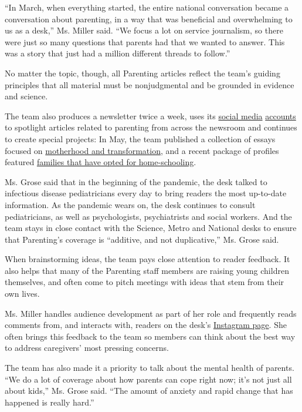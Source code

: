 ``In March, when everything started, the entire national conversation
became a conversation about parenting, in a way that was beneficial and
overwhelming to us as a desk,'' Ms. Miller said. ``We focus a lot on
service journalism, so there were just so many questions that parents
had that we wanted to answer. This was a story that just had a million
different threads to follow.''

No matter the topic, though, all Parenting articles reflect the team's
guiding principles that all material must be nonjudgmental and be
grounded in evidence and science.

The team also produces a newsletter twice a week, uses its
\href{https://www.instagram.com/nytparenting/?hl=en}{social media}
\href{https://twitter.com/NYTParenting?ref_src=twsrc\%5Egoogle\%7Ctwcamp\%5Eserp\%7Ctwgr\%5Eauthor}{accounts}
to spotlight articles related to parenting from across the newsroom and
continues to create special projects: In May, the team published a
collection of essays focused on
\href{https://www.nytimes3xbfgragh.onion/2020/05/07/parenting/motherhood-changes-us-all.html}{motherhood
and transformation}, and a recent package of profiles featured
\href{https://www.nytimes3xbfgragh.onion/2020/08/18/parenting/homeschool-coronavirus.html}{families
that have opted for home-schooling}.

Ms. Grose said that in the beginning of the pandemic, the desk talked to
infectious disease pediatricians every day to bring readers the most
up-to-date information. As the pandemic wears on, the desk continues to
consult pediatricians, as well as psychologists, psychiatrists and
social workers. And the team stays in close contact with the Science,
Metro and National desks to ensure that Parenting's coverage is
``additive, and not duplicative,'' Ms. Grose said.

When brainstorming ideas, the team pays close attention to reader
feedback. It also helps that many of the Parenting staff members are
raising young children themselves, and often come to pitch meetings with
ideas that stem from their own lives.

Ms. Miller handles audience development as part of her role and
frequently reads comments from, and interacts with, readers on the
desk's \href{https://www.instagram.com/nytparenting/?hl=en}{Instagram
page}. She often brings this feedback to the team so members can think
about the best way to address caregivers' most pressing concerns.

The team has also made it a priority to talk about the mental health of
parents. ``We do a lot of coverage about how parents can cope right now;
it's not just all about kids,'' Ms. Grose said. ``The amount of anxiety
and rapid change that has happened is really hard.''

